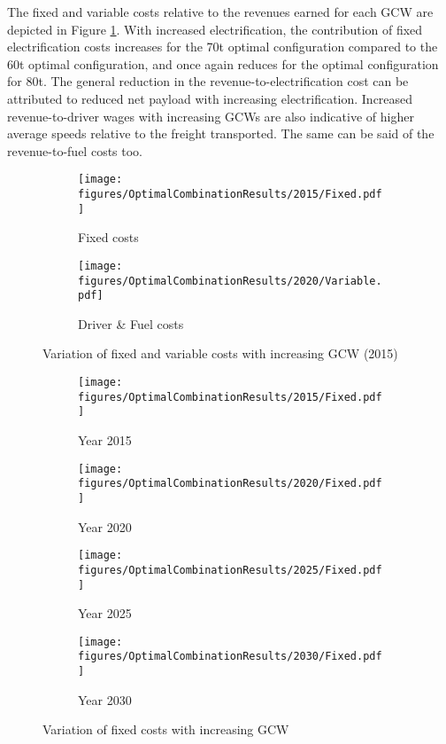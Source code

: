 \documentclass[ExampleMasters.tex]{subfiles}
\begin{document}
	The fixed and variable costs relative to the revenues earned for each GCW are depicted in Figure \ref{fixedVariableCostVaryGCW2015}. With increased electrification, the contribution of fixed electrification costs increases for the 70t optimal configuration compared to the 60t optimal configuration, and once again reduces for the optimal configuration for 80t. The general reduction in the revenue-to-electrification cost can be attributed to reduced net payload with increasing electrification. Increased revenue-to-driver wages with increasing GCWs are also indicative of higher average speeds relative to the freight transported. The same can be said of the revenue-to-fuel costs too.\\ 

	\begin{figure}[H]
		\begin{subfigure}{.5\textwidth}
			\centering
			\texttt{[image: figures/OptimalCombinationResults/2015/Fixed.pdf]}
			\caption{Fixed costs}
		\end{subfigure}
		\begin{subfigure}{.5\textwidth}
			\centering
			\texttt{[image: figures/OptimalCombinationResults/2020/Variable.pdf]}
			\caption{Driver \& Fuel costs}
		\end{subfigure}
		\caption{Variation of fixed and variable costs with increasing GCW (2015)}
		\label{fixedVariableCostVaryGCW2015}
	\end{figure}

	\newpage


	\begin{figure}[ht!]
		\begin{subfigure}{.5\textwidth}
			\centering
			\texttt{[image: figures/OptimalCombinationResults/2015/Fixed.pdf]}
			\caption{Year 2015}
		\end{subfigure}
		\begin{subfigure}{.5\textwidth}
			\centering
			\texttt{[image: figures/OptimalCombinationResults/2020/Fixed.pdf]}
			\caption{Year 2020}
		\end{subfigure}
		\begin{subfigure}{.5\textwidth}
			\centering
			\texttt{[image: figures/OptimalCombinationResults/2025/Fixed.pdf]}
			\caption{Year 2025}
		\end{subfigure}
		\begin{subfigure}{.5\textwidth}
			\centering
			\texttt{[image: figures/OptimalCombinationResults/2030/Fixed.pdf]}
			\caption{Year 2030}
		\end{subfigure}
		\caption{Variation of fixed costs with increasing GCW}
		\label{fixedCostVsGCWOverYears}
	\end{figure}
\end{document}
